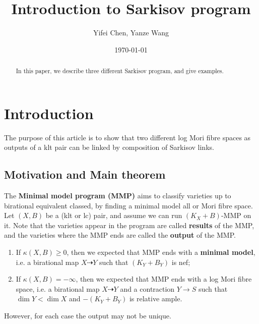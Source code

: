 \documentclass[11pt]{amsart}
\numberwithin{equation}{section}
\begin{document}
\title{Introduction to Sarkisov program}

\author{Yifei Chen, Yanze Wang}

\begin{abstract}
In this paper, we describe three different Sarkisov program, and give examples.
\end{abstract}

\address{UCAS}


\address{Shanghai Center for Mathematical Sciences, Fudan University, Shanghai, 200438, China}





\date{\today}


\maketitle

\tableofcontents


\section{Introduction}

The purpose of this article is to show that two different log Mori fibre spaces as outputs of a klt pair can be linked by composition of  Sarkisov links.

\subsection{Motivation and Main theorem}
The \textbf{Minimal model program (MMP)}  aims to classify varieties up to birational equivalent classed, by finding a minimal model all or Mori fibre space. Let $ \left(X,B\right) $ be a (klt or lc) pair, and assume we can run $ (K_X+B)$-MMP on it. Note that the varieties appear in the program are called \textbf{results} of the MMP, and the varieties where the MMP ends are called the \textbf{output} of the MMP.
\begin{enumerate}
  \item If $\kappa(X,B)\geqslant 0$, then we expected that MMP ends with a \textbf{minimal model}, i.e. a birational map $X \dashrightarrow Y$ such that $(K_Y+B_Y)$ is nef;
  \item If $\kappa(X,B)= -\infty$, then we expected that MMP ends with a log Mori fibre space, i.e. a birational map $X \dashrightarrow Y$ and a contraction $Y\to S$ such that $\dim Y<\dim X$ and $-(K_Y+B_Y)$ is relative ample.
\end{enumerate}
However, for each case the output may not be unique.
\end{document}
